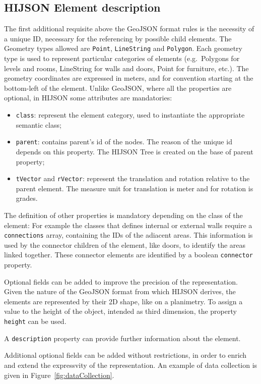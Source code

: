 \subsection{HIJSON Element description}

The first additional requisite above the GeoJSON format rules is the
necessity of a unique ID, necessary for the referencing by possible
child elements. The Geometry types allowed are \texttt{Point},
\texttt{LineString} and \texttt{Polygon}. Each geometry type is used to
represent particular categories of elements (e.g.~Polygons for levels
and rooms, LineString for walls and doors, Point for furniture, etc.).
The geometry coordinates are expressed in meters, and for convention
starting at the bottom-left of the element. Unlike GeoJSON, where all
the properties are optional, in HIJSON some attributes are mandatories:

\begin{itemize}
\itemsep1pt\parskip0pt
\item
 \texttt{class}: represent the element category, used to instantiate
 the appropriate semantic class;
\item
 \texttt{parent}: contains parent's id of the nodes. The reason of the
 unique id depends on this property. The HIJSON Tree is created on the
 base of parent property;
\item
 \texttt{tVector} and \texttt{rVector}: represent the translation and
 rotation relative to the parent element. The measure unit for
 translation is meter and for rotation is grades.
\end{itemize}

The definition of other properties is mandatory depending on the class
of the element: For example the classes that defines internal or
external walls require a \texttt{connections} array, containing the IDs
of the adiacent areas. This information is used by the connector
children of the element, like doors, to identify the areas linked
together. These connector elements are identified by a
boolean \texttt{connector} property.

Optional fields can be added to improve the precision of the
representation. Given the nature of the GeoJSON format from which HIJSON
derives, the elements are represented by their 2D shape, like on a
planimetry. To assign a value to the height of the object, intended as
third dimension, the property \texttt{height} can be used.

A \texttt{description} property can provide further information about
the element.

Additional optional fields can be added without restrictions, in order 
to enrich and extend the expressvity of the representation. An example of data collection is given in Figure~\ref{fig:dataCollection}.

